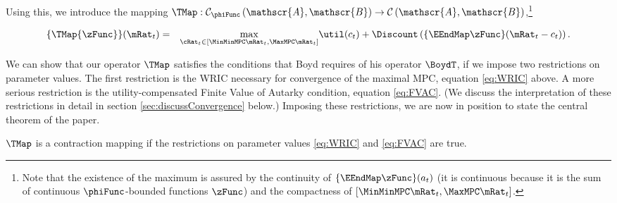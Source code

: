 \documentclass[titlepage]{\econtex}\providecommand{\texname}{BufferStockTheory}%
\begin{document}
Using this, we introduce the mapping \textit{$\TMap:\mathcal{C}_{\phiFunc }\left( \mathscr{A},\mathscr{B}\right) \rightarrow \mathcal{C}\left(
    \mathscr{A},\mathscr{B}\right) $},\footnote{Note that the existence of the maximum is assured by the continuity of $\{\EEndMap \zFunc\}(a_{t})$ (it is continuous because it is the sum of continuous $\phiFunc$-bounded functions $\zFunc$) and the compactness of $[\MinMinMPC \mRat_{t},  \MaxMPC \mRat_{t}]$.}
\begin{comment} %
(In the subtle case when $\MinMinMPC=0$, the compact interval could be revised as $ [(\MinMinMPC+\epsilon) \mRat_{t},
  \MaxMPC \mRat_{t}]$ where $\epsilon$ is a very small positive number because obviously $\MinMinMPC \mRat_{t}=0$ will not be the $\argmax$)
\end{comment}
\begin{eqnarray}
\{\TMap{\zFunc}\}(\mRat_{t}) &=&\underset{{\cRat}_{t} \in
[\MinMinMPC \mRat_{t}, \MaxMPC \mRat_{t}]
} \max
\util(c_{t})+\Discount \left( \{\EEndMap \zFunc \}(\mRat_{t}-c_{t}) \right)  \label{definitionmappingT}.
%
\end{eqnarray}


\begin{comment}
Unpacking the definitions, our mapping $\TMap$ can be written more explicitly as
\begin{eqnarray}
\{\TMap\zFunc\}(\mRat_{t}) &=&\underset{\cRat_{t} \in [\MinMinMPC
  \mRat_{t}, \MaxMPC \mRat_{t}]} \max \left\{
\util(c_{t})+\Discount \Ex_{t}\left[ {\PGro}_{t+1} ^{1-\CRRA }\zFunc(
{\aRat}_{t}\Rnorm_{t+1}+\tShkAll_{t+1}) \right] \right\}
.
\end{eqnarray}
\end{comment}

We can show that our operator $\TMap$ satisfies the conditions that
Boyd requires of his operator $\BoydT$, if we impose two restrictions
on parameter values.  The first restriction is the WRIC necessary for
convergence of the maximal MPC, equation \eqref{eq:WRIC} above.  A
more serious restriction is the utility-compensated Finite Value of
Autarky condition, equation \eqref{eq:FVAC}.  (We discuss the
interpretation of these restrictions in detail in section
\ref{sec:discussConvergence} below.)  Imposing these restrictions, we
are now in position to state the central theorem of the paper.

\setcounter{theorem}{0}
\begin{theorem}
  \label{thm:contmap} $\TMap$ is a contraction mapping if
  the restrictions on parameter values \eqref{eq:WRIC} and
  \eqref{eq:FVAC} are true.
\end{theorem}
\end{document}
